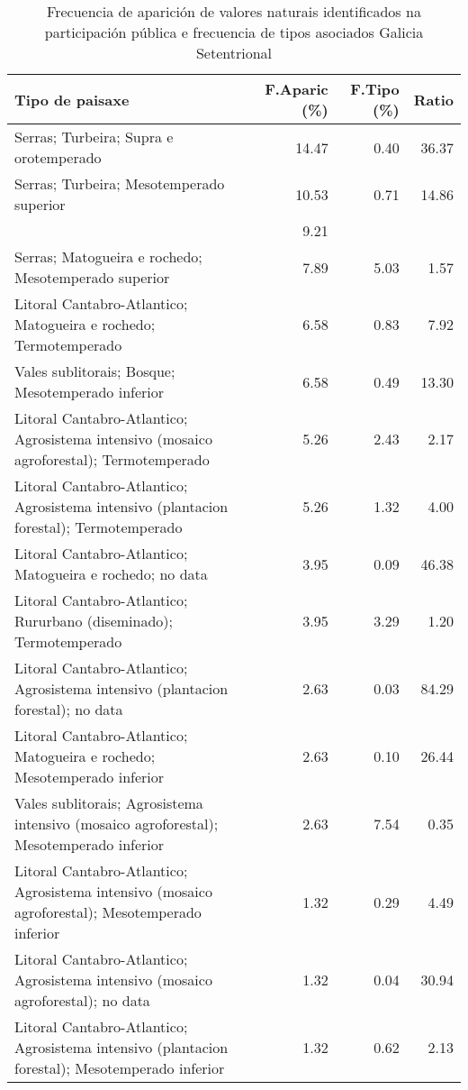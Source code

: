 \begin{table}[p]
\centering
\caption{Frecuencia de aparición de valores naturais identificados na participación pública e frecuencia de tipos asociados Galicia Setentrional} 
\label{vsixotnat10}
\begin{tabular}{lrrr}
  \hline
Tipo de paisaxe & F.Aparic (\%) & F.Tipo (\%) & Ratio \\ 
  \hline
Serras; Turbeira; Supra e orotemperado & 14.47 & 0.40 & 36.37 \\ 
  Serras; Turbeira; Mesotemperado superior & 10.53 & 0.71 & 14.86 \\ 
   & 9.21 &  &  \\ 
  Serras; Matogueira e rochedo; Mesotemperado superior & 7.89 & 5.03 & 1.57 \\ 
  Litoral Cantabro-Atlantico; Matogueira e rochedo; Termotemperado & 6.58 & 0.83 & 7.92 \\ 
  Vales sublitorais; Bosque; Mesotemperado inferior & 6.58 & 0.49 & 13.30 \\ 
  Litoral Cantabro-Atlantico; Agrosistema intensivo (mosaico agroforestal); Termotemperado & 5.26 & 2.43 & 2.17 \\ 
  Litoral Cantabro-Atlantico; Agrosistema intensivo (plantacion forestal); Termotemperado & 5.26 & 1.32 & 4.00 \\ 
  Litoral Cantabro-Atlantico; Matogueira e rochedo; no data & 3.95 & 0.09 & 46.38 \\ 
  Litoral Cantabro-Atlantico; Rururbano (diseminado); Termotemperado & 3.95 & 3.29 & 1.20 \\ 
  Litoral Cantabro-Atlantico; Agrosistema intensivo (plantacion forestal); no data & 2.63 & 0.03 & 84.29 \\ 
  Litoral Cantabro-Atlantico; Matogueira e rochedo; Mesotemperado inferior & 2.63 & 0.10 & 26.44 \\ 
  Vales sublitorais; Agrosistema intensivo (mosaico agroforestal); Mesotemperado inferior & 2.63 & 7.54 & 0.35 \\ 
  Litoral Cantabro-Atlantico; Agrosistema intensivo (mosaico agroforestal); Mesotemperado inferior & 1.32 & 0.29 & 4.49 \\ 
  Litoral Cantabro-Atlantico; Agrosistema intensivo (mosaico agroforestal); no data & 1.32 & 0.04 & 30.94 \\ 
  Litoral Cantabro-Atlantico; Agrosistema intensivo (plantacion forestal); Mesotemperado inferior & 1.32 & 0.62 & 2.13 \\ 

\end{tabular}
\end{table}
